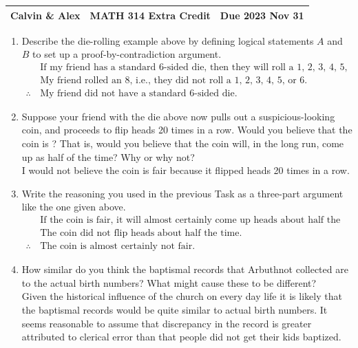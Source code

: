 \documentclass[a4paper, 12pt]{../../config/homework}
\begin{document}
\noindent
\begin{tabularx}{\textwidth}{>{\centering\arraybackslash}X>{\centering\arraybackslash}X>{\centering\arraybackslash}X}
Calvin \& Alex & MATH 314 Extra Credit & Due 2023 Nov 31\\
\midrule
\end{tabularx}

\begin{enumerate}[label=\textbf{Task \arabic*}]
\item Describe the die-rolling example above by defining logical statements \(A\) and \(B\) to set up a proof-by-contradiction argument.
\begin{align*}
\phantom{\therefore}&\,\text{If my friend has a standard 6-sided die, then they will roll a 1, 2, 3, 4, 5, or 6.}\\
\phantom{\therefore}&\,\text{My friend rolled an 8, i.e., they did not roll a 1, 2, 3, 4, 5, or 6.}\\
\therefore & \,\text{My friend did not have a standard 6-sided die.}
\end{align*}

\item Suppose your friend with the die above now pulls out a suspicious-looking coin, and proceeds to flip heads 20 times in a row. Would you believe that the coin is ? That is, would you believe that the coin will, in the long run, come up as  half of the time? Why or why not?
\\ I would not believe the coin is fair because it flipped heads 20 times in a row.

\item Write the reasoning you used in the previous Task as a three-part argument like the one given above.
\begin{align*}
\phantom{\therefore}&\,\text{If the coin is fair, it will almost certainly come up heads about half the time.}\\
\phantom{\therefore}&\,\text{The coin did not flip heads about half the time.}\\
\therefore&\,\text{The coin is almost certainly not fair.}
\end{align*}

\item How similar do you think the baptismal records that Arbuthnot collected are to the actual birth numbers? What might cause these to be different?
\\ Given the historical influence of the church on every day life it is likely that the baptismal records would be quite similar to actual birth numbers. It seems reasonable to assume that discrepancy in the record is greater attributed to clerical error than that people did not get their kids baptized.


\end{enumerate}
\end{document}
